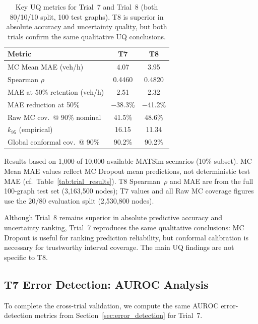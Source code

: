 \begin{table}[htbp]
\centering
\caption[T7 vs T8 UQ comparison]{Key UQ metrics for Trial~7 and Trial~8 (both 80/10/10 split, 100 test graphs). T8 is superior in absolute accuracy and uncertainty quality, but both trials confirm the same qualitative UQ conclusions.}
\label{tab:t7_t8_comparison}
\begin{tabular}{lcc}
\toprule
\textbf{Metric} & \textbf{T7} & \textbf{T8} \\
\midrule
MC Mean MAE (veh/h) & 4.07 & 3.95 \\
Spearman $\rho$ & 0.4460 & 0.4820 \\
MAE at 50\% retention (veh/h) & 2.51 & 2.32 \\
MAE reduction at 50\% & $-$38.3\% & $-$41.2\% \\
Raw MC cov.\ @ 90\% nominal & 41.5\% & 48.6\% \\
$k_{95}$ (empirical) & 16.15 & 11.34 \\
Global conformal cov.\ @ 90\% & 90.2\% & 90.2\% \\
\bottomrule
\end{tabular}
\vspace{2pt}
\begin{minipage}{\linewidth}
\footnotesize Results based on 1,000 of 10,000 available MATSim scenarios (10\% subset). MC Mean MAE values reflect MC Dropout mean predictions, not deterministic test MAE (cf.\ Table~\ref{tab:trial_results}). T8 Spearman~$\rho$ and MAE are from the full 100-graph test set (3,163,500 nodes); T7 values and all Raw MC coverage figures use the 20/80 evaluation split (2,530,800 nodes).
\end{minipage}
\end{table}

Although Trial~8 remains superior in absolute predictive accuracy and uncertainty ranking, Trial~7 reproduces the same qualitative conclusions: MC Dropout is useful for ranking prediction reliability, but conformal calibration is necessary for trustworthy interval coverage. The main UQ findings are not specific to T8.

\subsection{T7 Error Detection: AUROC Analysis}
\label{sec:t7_auroc}

To complete the cross-trial validation, we compute the same AUROC error-detection metrics from Section~\ref{sec:error_detection} for Trial~7.

